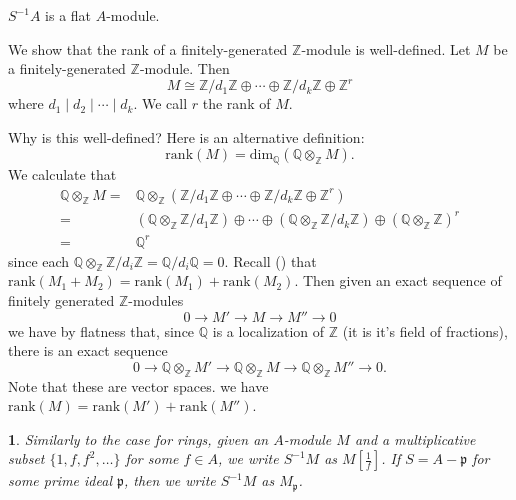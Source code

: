 \documentclass[12pt]{article}
\newtheorem{para}[theorem]{}
\begin{document}
\begin{corollary}
	$S^{-1}A$ is a flat $A$-module.
\end{corollary}

\begin{example}
	We show that the rank of a finitely-generated $\mathbb{Z}$-module is well-defined. Let $M$ be a finitely-generated $\mathbb{Z}$-module. Then 
	\begin{equation*}
		M \cong \mathbb{Z}/d_1\mathbb{Z} \oplus \cdots \oplus \mathbb{Z}/d_k\mathbb{Z} \oplus \mathbb{Z}^r
	\end{equation*}
	where $d_1\mid d_2\mid \cdots \mid d_k$. We call $r$ the rank of $M$. 

	Why is this well-defined? Here is an alternative definition:
	\begin{equation*}
		\text{rank}(M)=\text{dim}_\mathbb{Q}(\mathbb{Q}\otimes_\mathbb{Z} M).
	\end{equation*}
	We calculate that 
	\begin{align*}
		\mathbb{Q}\otimes_\mathbb{Z} M =& \mathbb{Q} \otimes_\mathbb{Z} (\mathbb{Z}/d_1\mathbb{Z} \oplus \cdots \oplus \mathbb{Z}/d_k\mathbb{Z} \oplus\mathbb{Z}^r) \\
		=& (\mathbb{Q}\otimes_\mathbb{Z} \mathbb{Z}/d_1\mathbb{Z}) \oplus \cdots \oplus (\mathbb{Q}\otimes_\mathbb{Z} \mathbb{Z}/d_k\mathbb{Z}) \oplus (\mathbb{Q}\otimes_\mathbb{Z}\mathbb{Z})^r \\
		=& \mathbb{Q}^r
	\end{align*}
	since each $\mathbb{Q}\otimes_\mathbb{Z} \mathbb{Z}/d_i\mathbb{Z}=\mathbb{Q}/d_i\mathbb{Q}=0$. Recall () that $\text{rank}(M_1+M_2)=\text{rank}(M_1)+\text{rank}(M_2)$. Then given an exact sequence of finitely generated $\mathbb{Z}$-modules 
	\begin{equation*}
		0\to M'\to M\to M''\to 0
	\end{equation*}
	we have by flatness that, since $\mathbb{Q}$ is a localization of $\mathbb{Z}$ (it is it's field of fractions), there is an exact sequence 
	\begin{equation*}
		0 \to \mathbb{Q}\otimes_\mathbb{Z} M' \to \mathbb{Q}\otimes_\mathbb{Z} M \to \mathbb{Q}\otimes_\mathbb{Z}M''\to 0.
	\end{equation*}
	Note that these are vector spaces.  we have $\text{rank}(M)=\text{rank}(M')+\text{rank}(M'')$. 
\end{example}

\begin{para}
	Similarly to the case for rings, given an $A$-module $M$ and a multiplicative subset $\{1,f,f^2,\dots\}$ for some $f\in A$, we write $S^{-1}M$ as $M[\frac{1}{f}]$. If $S=A-\mathfrak{p}$ for some prime ideal $\mathfrak{p}$, then we write $S^{-1}M$ as $M_\mathfrak{p}$. 
\end{para}
\end{document}
